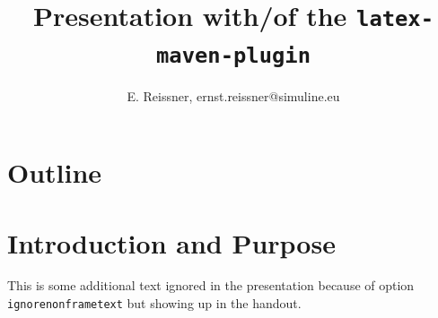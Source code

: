 






\newcommand{\goal}[1]{\texttt{#1}\index{goal!#1}}%
\newcommand{\tool}[1]{\texttt{#1}\index{tool!#1}}%



\title{Presentation with/of the \texttt{latex-maven-plugin}}
\author{E. Reissner, ernst.reissner@simuline.eu}
\date{\Today}

\hypersetup{colorlinks=true,allcolors=blue}%
\hypersetup{colorlinks,linkcolor=blue,urlcolor=blue,citecolor=blue}%
\hypersetup{frenchlinks}

 




\begin{frame}
  \titlepage%
\end{frame}

\section*{Outline}

\begin{frame}
  \tableofcontents
\end{frame}

\section{Introduction and Purpose}

This is some additional text ignored in the presentation 
because of option \texttt{ignorenonframetext} 
but showing up in the handout. 


